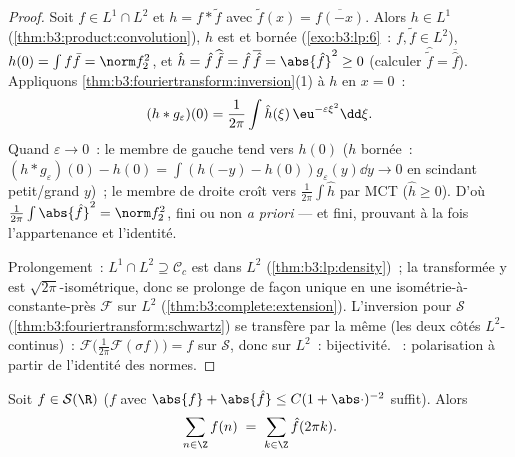\begin{proof}
Soit $f \in L^1\cap L^2$ et $h = f * \tilde f$ avec
$\tilde f(x) = \overline{f(-x)}$. Alors $h \in L^1$
(\cref{thm:b3:product:convolution}), $h$ est  et
bornée (\cref{exo:b3:lp:6}~: $f, \tilde f \in L^2$), $h(0) =
\int f\bar f = \norm f_2^2$, et $\hat h = \hat
f\,\widehat{\tilde f} = \hat f\,\overline{\hat f} =
\abs{\hat f}^2 \geq 0$ (calculer $\widehat{\tilde f} =
\overline{\hat f}$). Appliquons
\cref{thm:b3:fouriertransform:inversion}(1) à $h$ en $x =
0$~:
\[
(h * g_\varepsilon)(0) = \frac1{2\pi}\int \hat
h(\xi)\,\eu^{-\varepsilon\xi^2}\dd\xi .
\]
Quand $\varepsilon \to 0$~: le membre de gauche tend vers
$h(0)$ ($h$  bornée~: $(h*g_\varepsilon)(0) - h(0) =
\int(h(-y) - h(0))g_\varepsilon(y)\dd y \to 0$ en scindant
petit/grand $y$)~; le membre de droite croît vers
$\frac1{2\pi}\int\hat h$ par MCT ($\hat h \geq 0$). D'où
$\frac1{2\pi}\int\abs{\hat f}^2 = \norm f_2^2$, fini ou non
\emph{a priori} --- et fini, prouvant à la fois l'appartenance
et l'identité.

Prolongement~: $L^1\cap L^2 \supseteq \mathcal C_c$ est 
dans $L^2$ (\cref{thm:b3:lp:density})~; la transformée y est
$\sqrt{2\pi}$-isométrique, donc se prolonge de façon unique en
une isométrie-à-constante-près $\mathcal F$ sur $L^2$
(\cref{thm:b3:complete:extension}). L'inversion pour
$\mathcal S$ (\cref{thm:b3:fouriertransform:schwartz}) se
transfère par la même  (les deux côtés $L^2$-continus)~:
$\mathcal F\bigl(\frac1{2\pi}\mathcal F(\sigma f)\bigr) = f$
sur $\mathcal S$, donc sur $L^2$~: bijectivité. ~: polarisation à partir de l'identité des normes.
\end{proof}

\begin{theorem}
\label{thm:b3:fouriertransform:poisson}
Soit $f \in \mathcal S(\R)$ ($f$  avec $\abs{f} +
\abs{\hat f} \leq C(1 + \abs\cdot)^{-2}$ suffit).
Alors
\[
\sum_{n\in\Z} f(n) \;=\; \sum_{k\in\Z}\hat f(2\pi k) .
\]
\end{theorem}

